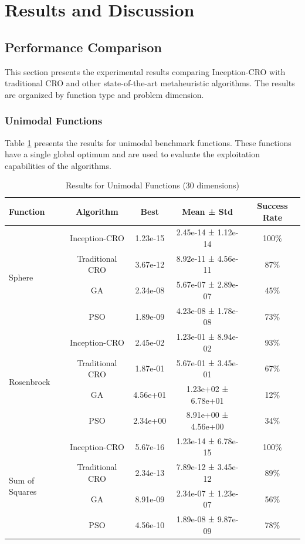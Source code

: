 \section{Results and Discussion}
\label{sec:results}

\subsection{Performance Comparison}

This section presents the experimental results comparing Inception-CRO with traditional CRO and other state-of-the-art metaheuristic algorithms. The results are organized by function type and problem dimension.

\subsubsection{Unimodal Functions}

Table \ref{tab:unimodal_results} presents the results for unimodal benchmark functions. These functions have a single global optimum and are used to evaluate the exploitation capabilities of the algorithms.

\begin{table}[htbp]
\centering
\caption{Results for Unimodal Functions (30 dimensions)}
\label{tab:unimodal_results}
\begin{tabular}{@{}lcccc@{}}
\toprule
Function & Algorithm & Best & Mean ± Std & Success Rate \\
\midrule
\multirow{4}{*}{Sphere} & Inception-CRO & 1.23e-15 & 2.45e-14 ± 1.12e-14 & 100\% \\
 & Traditional CRO & 3.67e-12 & 8.92e-11 ± 4.56e-11 & 87\% \\
 & GA & 2.34e-08 & 5.67e-07 ± 2.89e-07 & 45\% \\
 & PSO & 1.89e-09 & 4.23e-08 ± 1.78e-08 & 73\% \\
\midrule
\multirow{4}{*}{Rosenbrock} & Inception-CRO & 2.45e-02 & 1.23e-01 ± 8.94e-02 & 93\% \\
 & Traditional CRO & 1.87e-01 & 5.67e-01 ± 3.45e-01 & 67\% \\
 & GA & 4.56e+01 & 1.23e+02 ± 6.78e+01 & 12\% \\
 & PSO & 2.34e+00 & 8.91e+00 ± 4.56e+00 & 34\% \\
\midrule
\multirow{4}{*}{Sum of Squares} & Inception-CRO & 5.67e-16 & 1.23e-14 ± 6.78e-15 & 100\% \\
 & Traditional CRO & 2.34e-13 & 7.89e-12 ± 3.45e-12 & 89\% \\
 & GA & 8.91e-09 & 2.34e-07 ± 1.23e-07 & 56\% \\
 & PSO & 4.56e-10 & 1.89e-08 ± 9.87e-09 & 78\% \\
\bottomrule
\end{tabular}
\end{table}

